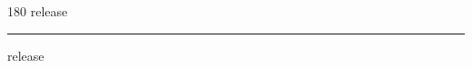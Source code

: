 
\begin{frame}
\begin{center}
\begin{turn}{180}
{\fontsize{2.5cm}{1em}\selectfont release}
\end{turn}
\vspace{1em}\par  
\hrule
\vspace{1em}\par  
{\fontsize{2.5cm}{1em}\selectfont release}
\end{center}
\end{frame}
